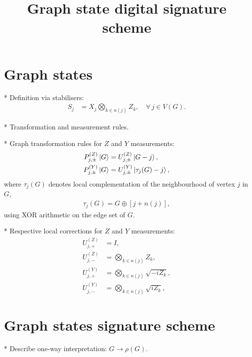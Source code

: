 \documentclass[twocolumn, aps, amsmath, amssymb, nofootinbib, superscriptaddress, longbibliography, doublefloatfix, table-of-contents, eqsecnum, rmp]{revtex4-2}
\begin{document}
\title{Graph state digital signature scheme}

\begin{abstract}
\end{abstract}

\maketitle

\tableofcontents

\section{Graph states}

* Definition via stabilisers:
\begin{align}
	S_j &= X_j \bigotimes_{k\in n(j)} Z_k,\quad \forall\, j\in V(G).
\end{align}

* Transformation and measurement rules. \cite{hein2006entanglement, PhysRevA.69.062311}

* Graph transformation rules for $Z$ and $Y$ measurements:
\begin{align}
	P_{j,\pm}^{(Z)} \ket{G} &= U_{j,\pm}^{(Z)} \ket{G-j},\nonumber\\
	P_{j,\pm}^{(Y)} \ket{G} &= U_{j,\pm}^{(Y)} \ket{\tau_j(G)-j},
\end{align}
where $\tau_j(G)$ denotes local complementation of the neighbourhood of vertex $j$ in $G$,
\begin{align}
	\tau_j(G) = G \oplus [j+n(j)],
\end{align}
using XOR arithmetic on the edge set of $G$.

* Respective local corrections for $Z$ and $Y$ measurements: 
\begin{align}
	U_{j,+}^{(Z)} &= I,\nonumber\\
	U_{j,-}^{(Z)} &= \bigotimes_{k\in n(j)} Z_k,\nonumber\\
	U_{j,+}^{(Y)} &= \bigotimes_{k\in n(j)} \sqrt{-i Z_k},\nonumber\\
	U_{j,-}^{(Y)} &= \bigotimes_{k\in n(j)} \sqrt{i Z_k},
\end{align}

\section{Graph states signature scheme}

* Describe one-way interpretation: $G\to\rho(G)$.
\end{document}
